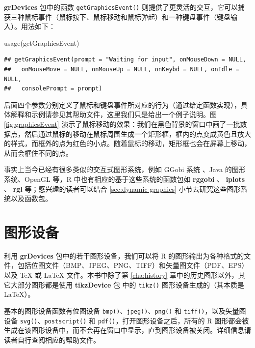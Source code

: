 \documentclass[
  b5paper,
  UTF8,twoside]{book}
\newenvironment{Shaded}{\begin{snugshade}}{\end{snugshade}}
\newcommand{\FunctionTok}[1]{\textcolor[rgb]{0.00,0.00,0.00}{#1}}
\newcommand{\NormalTok}[1]{#1}
\begin{document}
\textbf{grDevices} 包中的函数 \texttt{getGraphicsEvent()} 则提供了更灵活的交互，它可以捕获三种鼠标事件（鼠标按下、鼠标移动和鼠标弹起）和一种键盘事件（键盘输入）。用法如下：

\begin{Shaded}
\begin{Highlighting}[]
\FunctionTok{usage}\NormalTok{(getGraphicsEvent)}
\end{Highlighting}
\end{Shaded}

\begin{verbatim}
## getGraphicsEvent(prompt = "Waiting for input", onMouseDown = NULL,
##   onMouseMove = NULL, onMouseUp = NULL, onKeybd = NULL, onIdle = NULL,
##   consolePrompt = prompt)
\end{verbatim}

后面四个参数分别定义了鼠标和键盘事件所对应的行为（通过给定函数实现），具体解释和示例请参见其帮助文件，这里我们只是给出一个例子说明。图 \ref{fig:graphicsEvent} 演示了鼠标移动的效果：我们在黑色背景的窗口中画了一批数据点，然后通过鼠标的移动在鼠标周围生成一个矩形框，框内的点变成黄色且放大的样式，而框外的点为红色的小点。随着鼠标的移动，矩形框也会在屏幕上移动，从而会框住不同的点。

事实上当今已经有很多类似的交互式图形系统，例如 GGobi 系统 \citep{Cook07}、Java 的图形系统、OpenGL 等，R 中也有相应的基于这些系统的函数包如 \textbf{rggobi} \citep{rggobi}、 \textbf{iplots} \citep{iplots}、 \textbf{rgl} \citep{rgl} 等；感兴趣的读者可以结合 \ref{sec:dynamic-graphics} 小节去研究这些图形系统以及函数包。

\hypertarget{sec:device}{%
\section{图形设备}\label{sec:device}}

利用 \textbf{grDevices} 包中的若干图形设备，我们可以将 R 的图形输出为各种格式的文件，包括位图文件（BMP、JPEG、PNG、TIFF）和矢量图文件（PDF、EPS）以及 TeX 或 LaTeX 文件。本书中除了第 \ref{cha:history} 章中的历史图形以外，其它大部分图形都是使用 \textbf{tikzDevice} 包 \citep{tikzDevice} 中的 \texttt{tikz()} 图形设备生成的（其本质是 LaTeX）。

基本的图形设备函数有位图设备 \texttt{bmp()}、\texttt{jpeg()}、\texttt{png()} 和 \texttt{tiff()}，以及矢量图设备 \texttt{svg()}、\texttt{postscript()} 和 \texttt{pdf()}，打开图形设备之后，所有的 R 图形都会被生成在该图形设备中，而不会再在窗口中显示，直到图形设备被关闭。详细信息请读者自行查阅相应的帮助文件。
\end{document}
